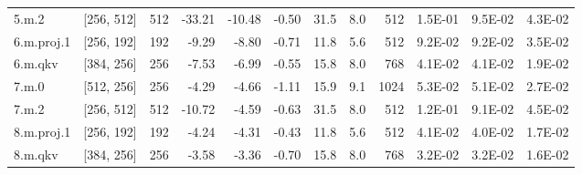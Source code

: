 \begin{table}
\begin{tabular}{llrrrrrrrrrr}
5.m.2 & [256, 512] & 512 & {\cellcolor[HTML]{FDB567}} \color[HTML]{000000} -33.21 & {\cellcolor[HTML]{FFF8B4}} \color[HTML]{000000} -10.48 & {\cellcolor[HTML]{EBF7A3}} \color[HTML]{000000} -0.50 & 31.5 & 8.0 & 512 & {\cellcolor[HTML]{EB5A3A}} \color[HTML]{F1F1F1} 1.5E-01 & {\cellcolor[HTML]{FECE7C}} \color[HTML]{000000} 9.5E-02 & {\cellcolor[HTML]{EEF8A8}} \color[HTML]{000000} 4.3E-02 \\
6.m.proj.1 & [256, 192] & 192 & {\cellcolor[HTML]{FFFCBA}} \color[HTML]{000000} -9.29 & {\cellcolor[HTML]{FFFDBC}} \color[HTML]{000000} -8.80 & {\cellcolor[HTML]{EBF7A3}} \color[HTML]{000000} -0.71 & 11.8 & 5.6 & 512 & {\cellcolor[HTML]{FED27F}} \color[HTML]{000000} 9.2E-02 & {\cellcolor[HTML]{FED481}} \color[HTML]{000000} 9.2E-02 & {\cellcolor[HTML]{E5F49B}} \color[HTML]{000000} 3.5E-02 \\
6.m.qkv & [384, 256] & 256 & {\cellcolor[HTML]{FEFFBE}} \color[HTML]{000000} -7.53 & {\cellcolor[HTML]{FDFEBC}} \color[HTML]{000000} -6.99 & {\cellcolor[HTML]{EBF7A3}} \color[HTML]{000000} -0.55 & 15.8 & 8.0 & 768 & {\cellcolor[HTML]{ECF7A6}} \color[HTML]{000000} 4.1E-02 & {\cellcolor[HTML]{ECF7A6}} \color[HTML]{000000} 4.1E-02 & {\cellcolor[HTML]{CBE982}} \color[HTML]{000000} 1.9E-02 \\
7.m.0 & [512, 256] & 256 & {\cellcolor[HTML]{F5FBB2}} \color[HTML]{000000} -4.29 & {\cellcolor[HTML]{F7FCB4}} \color[HTML]{000000} -4.66 & {\cellcolor[HTML]{ECF7A6}} \color[HTML]{000000} -1.11 & 15.9 & 9.1 & 1024 & {\cellcolor[HTML]{FBFDBA}} \color[HTML]{000000} 5.3E-02 & {\cellcolor[HTML]{FAFDB8}} \color[HTML]{000000} 5.1E-02 & {\cellcolor[HTML]{DAF08D}} \color[HTML]{000000} 2.7E-02 \\
7.m.2 & [256, 512] & 512 & {\cellcolor[HTML]{FFF8B4}} \color[HTML]{000000} -10.72 & {\cellcolor[HTML]{F7FCB4}} \color[HTML]{000000} -4.59 & {\cellcolor[HTML]{EBF7A3}} \color[HTML]{000000} -0.63 & 31.5 & 8.0 & 512 & {\cellcolor[HTML]{FB9D59}} \color[HTML]{000000} 1.2E-01 & {\cellcolor[HTML]{FED481}} \color[HTML]{000000} 9.1E-02 & {\cellcolor[HTML]{F1F9AC}} \color[HTML]{000000} 4.5E-02 \\
8.m.proj.1 & [256, 192] & 192 & {\cellcolor[HTML]{F5FBB2}} \color[HTML]{000000} -4.24 & {\cellcolor[HTML]{F5FBB2}} \color[HTML]{000000} -4.31 & {\cellcolor[HTML]{EBF7A3}} \color[HTML]{000000} -0.43 & 11.8 & 5.6 & 512 & {\cellcolor[HTML]{ECF7A6}} \color[HTML]{000000} 4.1E-02 & {\cellcolor[HTML]{EBF7A3}} \color[HTML]{000000} 4.0E-02 & {\cellcolor[HTML]{C9E881}} \color[HTML]{000000} 1.7E-02 \\
8.m.qkv & [384, 256] & 256 & {\cellcolor[HTML]{F4FAB0}} \color[HTML]{000000} -3.58 & {\cellcolor[HTML]{F2FAAE}} \color[HTML]{000000} -3.36 & {\cellcolor[HTML]{EBF7A3}} \color[HTML]{000000} -0.70 & 15.8 & 8.0 & 768 & {\cellcolor[HTML]{E0F295}} \color[HTML]{000000} 3.2E-02 & {\cellcolor[HTML]{E0F295}} \color[HTML]{000000} 3.2E-02 & {\cellcolor[HTML]{C7E77F}} \color[HTML]{000000} 1.6E-02 \\

\end{tabular}
\end{table}
